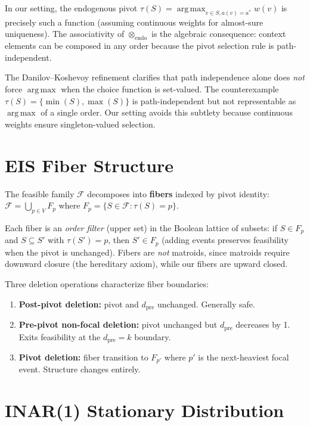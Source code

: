 \documentclass[11pt]{article}
\theoremstyle{plain}
\theoremstyle{definition}
\theoremstyle{remark}
\newcommand{\opendo}{\otimes_{\mathrm{endo}}}
\newcommand{\dpre}[1][]{d_{\mathrm{pre}#1}}
\DeclareMathOperator*{\argmax}{arg\,max}
\begin{document}
In our setting, the endogenous pivot $\tau(S) = \argmax_{v \in S, a(v)
= a^*} w(v)$ is precisely such a function (assuming continuous weights
for almost-sure uniqueness).  The associativity of $\opendo$ is the
algebraic consequence: context elements can be composed in any order
because the pivot selection rule is path-independent.

The Danilov--Koshevoy refinement \cite{danilov2003choice} clarifies that
path independence alone does \emph{not} force $\argmax$ when the choice
function is set-valued.  The counterexample $\tau(S) = \{\min(S),
\max(S)\}$ is path-independent but not representable as $\argmax$ of a
single order.  Our setting avoids this subtlety because continuous
weights ensure singleton-valued selection.

\section{EIS Fiber Structure}\label{app:fibers}

The feasible family $\mathcal{F}$ decomposes into \textbf{fibers}
indexed by pivot identity: $\mathcal{F} = \bigcup_{p \in V} F_p$ where
$F_p = \{S \in \mathcal{F} : \tau(S) = p\}$.

Each fiber is an \emph{order filter} (upper set) in the Boolean lattice
of subsets: if $S \in F_p$ and $S \subseteq S'$ with $\tau(S') = p$,
then $S' \in F_p$ (adding events preserves feasibility when the pivot
is unchanged).  Fibers are \emph{not} matroids, since matroids require
downward closure (the hereditary axiom), while our fibers are upward
closed.

Three deletion operations characterize fiber boundaries:
\begin{enumerate}[nosep]
  \item \textbf{Post-pivot deletion:} pivot and $\dpre$ unchanged.
    Generally safe.
  \item \textbf{Pre-pivot non-focal deletion:} pivot unchanged but
    $\dpre$ decreases by 1.  Exits feasibility at the $\dpre = k$
    boundary.
  \item \textbf{Pivot deletion:} fiber transition to $F_{p'}$ where
    $p'$ is the next-heaviest focal event.  Structure changes entirely.
\end{enumerate}

\section{INAR(1) Stationary Distribution}\label{app:inar}
\end{document}
